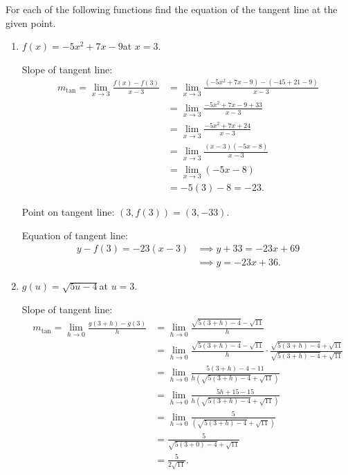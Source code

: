 \documentclass[nooutcomes,handout]{ximera}
\begin{document}
\begin{problem}
 For each of the following functions find the equation of the tangent line at the given point.
  \begin{enumerate}
    \item
      $f(x) = -5x^2 + 7x - 9$\quad at $x = 3$.
      \begin{freeResponse}
        Slope of tangent line:
        \begin{align*}
          m_{\mathrm{tan}} = \lim_{x \to 3} \frac{f(x) -f(3)}{x-3}
		&= \lim_{x \to 3} \frac{(-5x^2 + 7x - 9) - (-45 + 21 - 9)}{x-3}  \\
		&= \lim_{x \to 3} \frac{-5x^2 + 7x - 9 + 33}{x-3}  \\
		&= \lim_{x \to 3} \frac{-5x^2 + 7x + 24}{x-3}  \\
		&= \lim_{x \to 3} \frac{(x-3)(-5x -8)}{x-3}  \\
		&= \lim_{x \to 3} (-5x - 8)  \\
		&= -5(3) - 8 = -23.
	\end{align*}
        
        Point on tangent line: $(3, f(3)) = (3, -33)$.

        Equation of tangent line:
        \begin{align*}
          y - f(3) = -23(x-3) &\implies y + 33 = -23x + 69\\
          &\implies y = -23x + 36.
        \end{align*}
      \end{freeResponse}

    \item
      $g(u) = \sqrt{5u-4}$\quad at $u = 3$.
      \begin{freeResponse}
        Slope of tangent line:
        \begin{align*}
          m_{\mathrm{tan}} = \lim_{h \to 0} \frac{g(3+h) - g(3)}{h}
            &= \lim_{h \to 0} \frac{\sqrt{5(3+h) - 4} - \sqrt{11}}{h}\\
          		&=\lim_{h \to 0} \frac{\sqrt{5(3+h) - 4} - \sqrt{11}}{h} \cdot \frac{\sqrt{5(3+h) - 4} + \sqrt{11}}{\sqrt{5(3+h) - 4} + \sqrt{11}} \\
		&= \lim_{h \to 0} \frac{5(3+h) - 4 - 11}{h \left( \sqrt{5(3+h) - 4} + \sqrt{11} \right) }  \\
		&= \lim_{h \to 0} \frac{5h + 15 - 15}{h \left( \sqrt{5(3+h) - 4} + \sqrt{11} \right) }  \\
		&= \lim_{h \to 0} \frac{5}{\left( \sqrt{5(3+h) - 4} + \sqrt{11} \right) }  \\
		&= \frac{5}{\sqrt{5(3+0) - 4} + \sqrt{11}}  \\
		&= \frac{5}{2 \sqrt{11}}.
        \end{align*}


\end{freeResponse}
\end{enumerate}
\end{problem}
\end{document}
